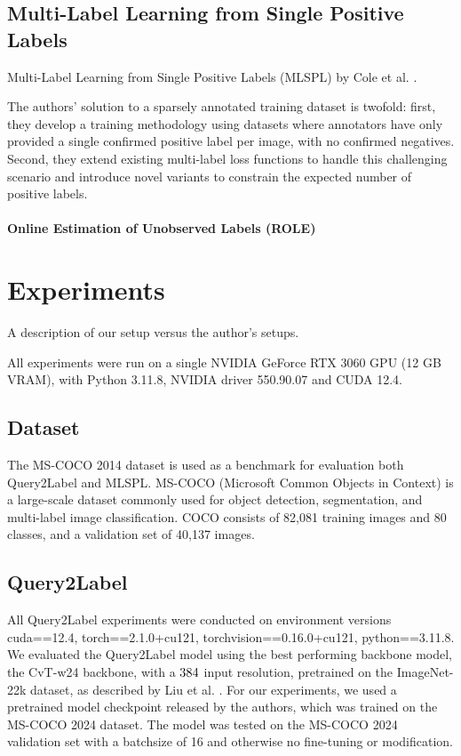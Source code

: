 \documentclass[lettersize,journal]{IEEEtran}
\begin{document}
\subsection{Multi-Label Learning from Single Positive Labels}
Multi-Label Learning from Single Positive Labels (MLSPL) by Cole et al. \cite{mlsp}.

The authors' solution to a sparsely annotated training dataset is twofold: first, they develop a training methodology using datasets where annotators have only provided a single confirmed positive label per image, with no confirmed negatives. Second, they extend existing multi-label loss functions to handle this challenging scenario and introduce novel variants to constrain the expected number of positive labels.

\paragraph{Online Estimation of Unobserved Labels (ROLE)}




\section{Experiments}
A description of our setup versus the author's setups.

\vspace{1em}

All experiments were run on a single NVIDIA GeForce RTX 3060 GPU (12 GB VRAM), with Python 3.11.8, NVIDIA driver 550.90.07 and CUDA 12.4. 

\subsection{Dataset}
The MS-COCO 2014 \cite{coco14} dataset is used as a benchmark for evaluation both Query2Label and MLSPL. MS-COCO (Microsoft Common Objects in Context) is a large-scale dataset commonly used for object detection, segmentation, and multi-label image classification. COCO consists of 82,081 training images and 80 classes, and a validation set of 40,137 images.

\subsection{Query2Label}
All Query2Label experiments were conducted on environment versions cuda==12.4, torch==2.1.0+cu121, torchvision==0.16.0+cu121, python==3.11.8.
We evaluated the Query2Label model using the best performing backbone model, the CvT-w24 backbone, with a $384\time 384$ input resolution, pretrained on the ImageNet-22k dataset, as described by Liu et al. \cite{Query2Label}. For our experiments, we used a pretrained model checkpoint released by the authors, which was trained on the MS-COCO 2024 dataset. The model was tested on the MS-COCO 2024 validation set with a batchsize of 16 and otherwise no fine-tuning or modification.
\end{document}
